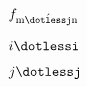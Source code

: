 \documentclass{article}
\begin{document}
$f_{\mathrm{m\acute{\dotlessj}n}}$

\dotlessi $i\dotlessi$

\dotlessj $j\dotlessj$
\end{document}
